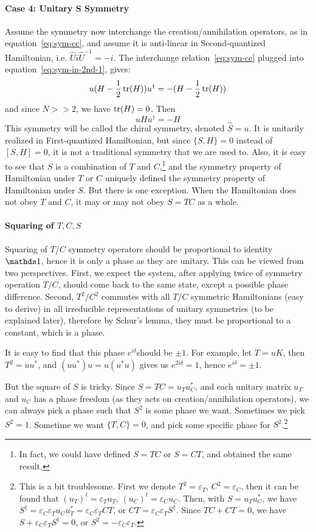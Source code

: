 \documentclass{article}
\begin{document}
\paragraph{Case 4: Unitary S Symmetry}
Assume the symmetry now interchange the creation/annihilation operators, as in
equation~\ref{eq:sym-cc}, and assume it is anti-linear in Second-quantized
Hamiltonian, i.e. $\hat{U}i\hat{U}^{-1}=-i$. The interchange
relation~\ref{eq:sym-cc} plugged into equation~\ref{eq:sym-in-2nd-1}, gives:
\begin{equation}
    \label{eq:sym-S-cond}
    u (H-\frac{1}{2}\tr(H)) u^\dagger = - (H-\frac{1}{2}\tr(H))
\end{equation}
and since $N>>2$, we have $\tr(H)=0$. Then
\begin{equation}
    u H u^\dagger = -H
\end{equation}
This symmetry will be called the chiral symmetry, denoted $\hat{S}=u$. It is
unitarily realized in First-quantized Hamiltonian, but since $\{S,H\}=0$ instead
of $[S,H]=0$, it is not a traditional symmetry that we are used to. Also, it is
easy to see that $S$ is a combination of $T$ and $C$,\footnote{In fact, we could have
defined $S=TC$ or $S=CT$, and obtained the same result.} and the symmetry
property of Hamiltonian under $T$ or $C$ uniquely defined the symmetry property
of Hamiltonian under $S$. But there is one exception. When the
Hamiltonian does not obey $T$ and $C$, it may or may not obey $S=TC$ as a
whole.

\paragraph{Squaring of $T,C,S$} 
Squaring of $T/C$ symmetry operators should be proportional to identity $\id$,
hence it is only a phase as they are unitary.
This can be viewed from two perspectives. First, we expect the system, after
applying twice of symmetry operation $T/C$, should come back to the same state, except
a possible phase difference. Second, $T^2/C^2$ commutes with all
$T/C$ symmetric Hamiltonians (easy to derive) in all irreducible representations
of unitary symmetries (to be explained later), therefore by Schur's lemma, they
must be proportional to a constant, which is a phase.

It is easy to find that this phase $e^{i\delta}$should be $\pm1$. For example, let $T=uK$,
then $T^2=uu^*$, and $(uu^*)u = u(u^*u)$ gives us $e^{2i\delta}=1$, hence
$e^{i\delta}=\pm1$.

But the square of $S$ is tricky. Since $S=TC=u_T u_C^*$, and each unitary matrix
$u_T$ and $u_C$ has a phase freedom (as they acts on creation/annihilation
operators), we can always pick a phase such that $S^2$ is some phase we want.
Sometimes we pick $S^2=1$. Sometime we want $\{T,C\}=0$, and pick some specific
phase for $S^2$.\footnote{This is a bit troublesome. First we denote
$T^2=\varepsilon_T$, $C^2=\varepsilon_C$, then it can be found that
$(u_T)^t=\varepsilon_T u_T$, $(u_C)^t = \varepsilon_C u_C$. Then, with
$S=u_Tu_C^*$, we have $S^\dagger=\varepsilon_C\varepsilon_Tu_Cu_T^* =
\varepsilon_C\varepsilon_T CT$, or $CT= \varepsilon_C\varepsilon_TS^\dagger$.
Since $TC+CT=0$, we have $S+\varepsilon_C\varepsilon_T S^\dagger=0$, or
$S^2=-\varepsilon_C\varepsilon_T$.}
\end{document}
